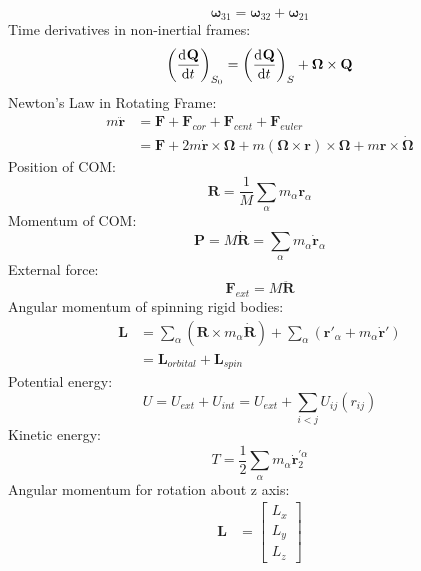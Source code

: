 \documentclass{article}
\renewcommand{\v}[1]{\ensuremath{\mathbf{#1}}} %
\renewcommand{\=}[1]{\stackrel{#1}{=}} %
\newcommand\m[1]{\begin{bmatrix}#1\end{bmatrix}}
\begin{document}
\begin{multicols}{4}
\begin{equation}
			\bm{\omega}_{31} = \bm{\omega}_{32} + \bm{\omega}_{21}
		\end{equation}
		Time derivatives in non-inertial frames:
		\begin{equation}
			\left(\dod{\v{Q}}{t}\right)_{S_0} = \left(\dod{\v{Q}}{t}\right)_{S} + \bm{\Omega} \times \v{Q}
		\end{equation}
		Newton's Law in Rotating Frame:
		\begin{equation}
			\begin{split}
				m\ddot{\v{r}} &= \v{F} + \v{F}_{cor} + \v{F}_{cent} + \v{F}_{euler} \\
				&= \v{F} + 2m\dot{\v{r}}\times \bm{\Omega} + m(\bm{\Omega} \times \v{r})\times \bm{\Omega} + m\v{r} \times \dot{\bm{\Omega}}
			\end{split}
		\end{equation}
		Position of COM:
		\begin{equation}
			\v{R} = \frac{1}{M}\sum_\alpha m_\alpha\v{r}_\alpha
		\end{equation}
		Momentum of COM:
		\begin{equation}
			\v{P} = M\dot{\v{R}} = \sum_\alpha m_\alpha \dot{\v{r}}_\alpha
		\end{equation}
		External force:
		\begin{equation}
			\v{F}_{ext} = M\ddot{\v{R}}
		\end{equation}
		Angular momentum of spinning rigid bodies:
		\begin{equation}
			\begin{split}
				\v{L} &= \sum_\alpha (\v{R} \times m_\alpha\dot{\v{R}}) + \sum_\alpha (\v{r}'_\alpha + m_\alpha\dot{\v{r}}') \\
				&= \v{L}_{orbital} + \v{L}_{spin}
			\end{split}
		\end{equation}
		Potential energy:
		\begin{equation}
			U = U_{ext} + U_{int} = U_{ext} + \sum_{i<j}U_{ij}(r_{ij})
		\end{equation}
		Kinetic energy:
		\begin{equation}
			T = \frac{1}{2}\sum_\alpha m_\alpha \dot{\v{r}}^{'\alpha}_2
		\end{equation}
		Angular momentum for rotation about z axis:
		\begin{equation}
			\begin{split}
				\v{L} &= \m{L_x \\ L_y \\ L_z} \\

\end{split}
\end{equation}
\end{multicols}
\end{document}
